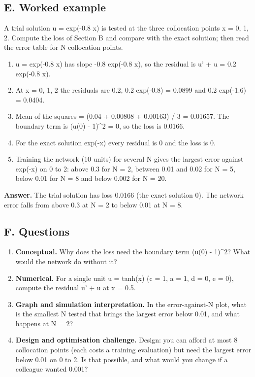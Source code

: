 \documentclass[11pt,a4paper]{article}
\begin{document}
\subsection*{E. Worked example}
A trial solution u = exp(-0.8 x) is tested at the three collocation points x = 0, 1, 2. Compute the loss of Section B and compare with the exact solution; then read the error table for N collocation points.
\begin{enumerate}[nosep]
\item u = exp(-0.8 x) has slope -0.8 exp(-0.8 x), so the residual is u' + u = 0.2 exp(-0.8 x).
\item At x = 0, 1, 2 the residuals are 0.2, 0.2 exp(-0.8) = 0.0899 and 0.2 exp(-1.6) = 0.0404.
\item Mean of the squares = (0.04 + 0.00808 + 0.00163) / 3 = 0.01657. The boundary term is (u(0) - 1)\textasciicircum{}2 = 0, so the loss is 0.0166.
\item For the exact solution exp(-x) every residual is 0 and the loss is 0.
\item Training the network (10 units) for several N gives the largest error against exp(-x) on 0 to 2: above 0.3 for N = 2, between 0.01 and 0.02 for N = 5, below 0.01 for N = 8 and below 0.002 for N = 20.
\end{enumerate}
\textbf{Answer.} The trial solution has loss 0.0166 (the exact solution 0). The network error falls from above 0.3 at N = 2 to below 0.01 at N = 8.

\subsection*{F. Questions}
\begin{enumerate}[nosep]
\item \textbf{Conceptual.} Why does the loss need the boundary term (u(0) - 1)\textasciicircum{}2? What would the network do without it?
\item \textbf{Numerical.} For a single unit u = tanh(x) (c = 1, a = 1, d = 0, e = 0), compute the residual u' + u at x = 0.5.
\item \textbf{Graph and simulation interpretation.} In the error-against-N plot, what is the smallest N tested that brings the largest error below 0.01, and what happens at N = 2?
\item \textbf{Design and optimisation challenge.} Design: you can afford at most 8 collocation points (each costs a training evaluation) but need the largest error below 0.01 on 0 to 2. Is that possible, and what would you change if a colleague wanted 0.001?
\end{enumerate}
\end{document}
